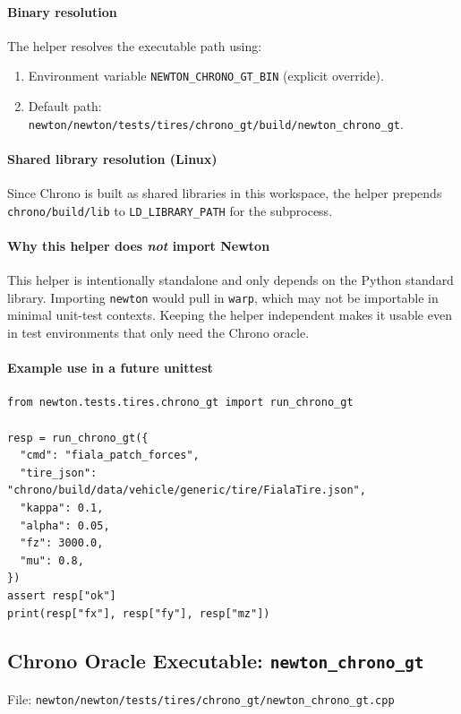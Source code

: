 \paragraph{Binary resolution}
The helper resolves the executable path using:
\begin{enumerate}
  \item Environment variable \texttt{NEWTON\_CHRONO\_GT\_BIN} (explicit override).
  \item Default path: \texttt{newton/newton/tests/tires/chrono\_gt/build/newton\_chrono\_gt}.
\end{enumerate}

\paragraph{Shared library resolution (Linux)}
Since Chrono is built as shared libraries in this workspace, the helper prepends
\texttt{chrono/build/lib} to \texttt{LD\_LIBRARY\_PATH} for the subprocess.

\paragraph{Why this helper does \emph{not} import Newton}
This helper is intentionally standalone and only depends on the Python standard library.
Importing \texttt{newton} would pull in \texttt{warp}, which may not be importable in minimal
unit-test contexts. Keeping the helper independent makes it usable even in test environments
that only need the Chrono oracle.

\paragraph{Example use in a future unittest}
\begin{verbatim}
from newton.tests.tires.chrono_gt import run_chrono_gt

resp = run_chrono_gt({
  "cmd": "fiala_patch_forces",
  "tire_json": "chrono/build/data/vehicle/generic/tire/FialaTire.json",
  "kappa": 0.1,
  "alpha": 0.05,
  "fz": 3000.0,
  "mu": 0.8,
})
assert resp["ok"]
print(resp["fx"], resp["fy"], resp["mz"])
\end{verbatim}

\subsection{Chrono Oracle Executable: \texttt{newton\_chrono\_gt}}
\label{sec:substep0-cli}
File: \texttt{newton/newton/tests/tires/chrono\_gt/newton\_chrono\_gt.cpp}

